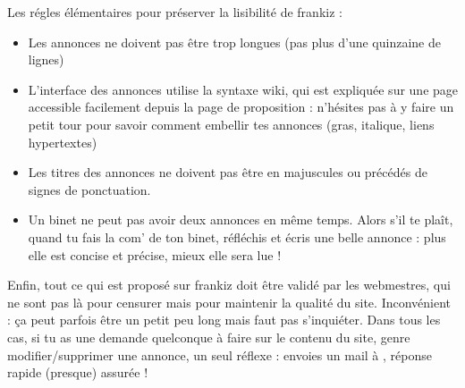 Les r\'egles \'el\'ementaires pour pr\'eserver la lisibilit\'e de frankiz :
\begin{itemize}
 \item Les annonces ne doivent pas \^etre trop longues (pas plus d'une quinzaine de lignes)
 \item L'interface des annonces utilise la syntaxe wiki, qui est expliqu\'ee
       sur une page accessible facilement depuis la page de proposition :
       n'h\'esites pas \`a y faire un petit tour pour savoir comment embellir tes annonces
       (gras, italique, liens hypertextes)
 \item Les titres des annonces ne doivent pas \^etre en majuscules ou pr\'ec\'ed\'es de signes de ponctuation.
 \item Un binet ne peut pas avoir deux annonces en m\^eme temps.
       Alors s'il te pla\^it, quand tu fais la com' de ton binet, r\'efl\'echis et \'ecris une belle annonce :
       plus elle est concise et pr\'ecise, mieux elle sera lue !
\end{itemize}

Enfin, tout ce qui est propos\'e sur frankiz doit \^etre valid\'e par les webmestres,
qui ne sont pas l\`a pour censurer mais pour maintenir la qualit\'e du site.
Inconv\'enient : \c{c}a peut parfois \^etre un petit peu long mais faut pas s'inqui\'eter.
Dans tous les cas, si tu as une demande quelconque \`a faire sur le contenu du site,
genre modifier/supprimer une annonce, un seul r\'eflexe :
envoies un mail \`a , r\'eponse rapide (presque) assur\'ee !
